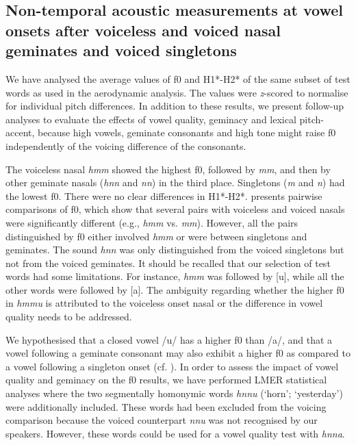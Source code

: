 \documentclass[output=paper]{langscibook}
\begin{document}
\subsection{Non-temporal acoustic measurements at vowel onsets after voiceless and voiced nasal geminates and voiced singletons}
\label{sec:shinohara:4.3}
We have analysed the average values of f0 and H1*-H2* of the same subset of test words as used in the aerodynamic analysis. The values were \textit{z}-scored to normalise for individual pitch differences. In addition to these results, we present follow-up analyses to evaluate the effects of vowel quality, geminacy and lexical pitch-accent, because high vowels, geminate consonants and high tone might raise f0 independently of the voicing difference of the consonants.

The voiceless nasal \textit{hmm} showed the highest f0, followed by \textit{mm}, and then by other geminate nasals (\textit{hnn} and \textit{nn}) in the third place. Singletons (\textit{m} and \textit{n}) had the lowest f0. There were no clear differences in H1*-H2*.  presents pairwise comparisons of f0, which show that several pairs with voiceless and voiced nasals were significantly different (e.g., \textit{hmm} vs. \textit{mm}). However, all the pairs distinguished by f0 either involved \textit{hmm} or were between singletons and geminates. The sound \textit{hnn} was only distinguished from the voiced singletons but not from the voiced geminates. It should be recalled that our selection of test words had some limitations. For instance, \textit{hmm} was followed by [u], while all the other words were followed by [a]. The ambiguity regarding whether the higher f0 in \textit{hmmu} is attributed to the voiceless onset nasal or the difference in vowel quality needs to be addressed.

We hypothesised that a closed vowel /u/ has a higher f0 than /a/, and that a vowel following a geminate consonant may also exhibit a higher f0 as compared to a vowel following a singleton onset (cf. ). In order to assess the impact of vowel quality and geminacy on the f0 results, we have performed LMER statistical analyses where the two segmentally homonymic words \textit{hnnu} (‘horn’; ‘yesterday’) were additionally included. These words had been excluded from the voicing comparison because the voiced counterpart \textit{nnu} was not recognised by our speakers. However, these words could be used for a vowel quality test with \textit{hnna}.
\end{document}
